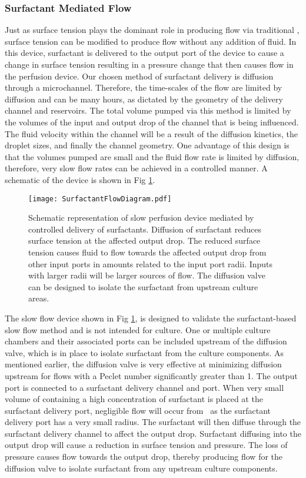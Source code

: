 \subsubsection{Surfactant Mediated Flow}\label{sec:deviceDesignSurf}
Just as surface tension plays the dominant role in producing flow via traditional \pp , surface tension can be modified to produce flow without any addition of fluid. In this device, surfactant is delivered to the output port of the device to cause a change in surface tension resulting in a pressure change that then causes flow in the perfusion device. Our chosen method of surfactant delivery is diffusion through a microchannel. Therefore, the time-scales of the flow are limited by diffusion and can be many hours, as dictated by the geometry of the delivery channel and reservoirs. The total volume pumped via this method is limited by the volumes of the input and output drop of the channel that is being influenced. The fluid velocity within the channel will be a result of the diffusion kinetics, the droplet sizes, and finally the channel geometry. One advantage of this design is that the volumes pumped are small and the fluid flow rate is limited by diffusion, therefore, very slow flow rates can be achieved in a controlled manner. A schematic of the device is shown in Fig \ref{fig:surfactantDevices}.

\begin{figure}[!ht]
\centering
\texttt{[image: SurfactantFlowDiagram.pdf]}
\caption{Schematic representation of slow perfusion device mediated by controlled delivery of surfactants. Diffusion of surfactant reduces surface tension at the affected output drop. The reduced surface tension causes fluid to flow towards the affected output drop from other input ports in amounts related to the input port radii. Inputs with larger radii will be larger sources of flow. The diffusion valve can be designed to isolate the surfactant from upstream culture areas.}
\label{fig:surfactantDevices}
\end{figure}

The slow flow device shown in Fig \ref{fig:surfactantDevices}, is designed to validate the surfactant-based slow flow method and is not intended for culture. One or multiple culture chambers and their associated ports can be included upstream of the diffusion valve, which is in place to isolate surfactant from the culture components. As mentioned earlier, the diffusion valve is very effective at minimizing diffusion upstream for flows with a Peclet number significantly greater than 1. The output port is connected to a surfactant delivery channel and port. When very small volume of containing a high concentration of surfactant is placed at the surfactant delivery port, negligible flow will occur from \pp\ as the surfactant delivery port has a very small radius. The surfactant will then diffuse through the surfactant delivery channel to affect the output drop. Surfactant diffusing into the output drop will cause a reduction in surface tension and pressure. The loss of pressure causes flow towards the output drop, thereby producing flow for the diffusion valve to isolate surfactant from any upstream culture components.

